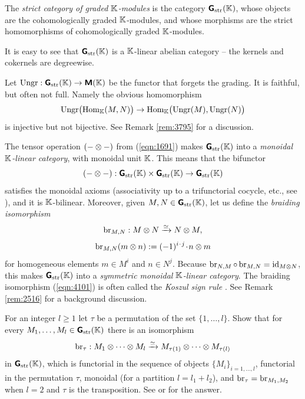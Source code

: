 \begin{dfn} \label{dfn:4100}
The {\em strict category of graded $\mathbb{K}$-modules}%
is the category $\boldsymbol{\mathsf{G}}_{\mathrm{str}}(\mathbb{K})$,
whose objects are the cohomologically graded $\mathbb{K}$-modules, and whose morphisms 
are the strict homomorphisms of cohomologically graded $\mathbb{K}$-mod\-ules.
\end{dfn}

It is easy to see that $\boldsymbol{\mathsf{G}}_{\mathrm{str}}(\mathbb{K})$ is a $\mathbb{K}$-linear abelian
category -- the kernels and cokernels are degreewise. 

\begin{rem} \label{rem:4120}
Let 
$\operatorname{Ungr} : \boldsymbol{\mathsf{G}}_{\mathrm{str}}(\mathbb{K}) \to \boldsymbol{\mathsf{M}}(\mathbb{K})$
be the functor that forgets the grading. It is faithful, but often not full. 
Namely the obvious homomorphism 
\[ \operatorname{Ungr} \bigl( \operatorname{Hom}_{\mathbb{K}}(M, N) \bigr) \to 
\operatorname{Hom}_{\mathbb{K}} \bigl( \operatorname{Ungr}(M), \operatorname{Ungr}(N) \bigr) \]
is injective but not bijective. 
See Remark \ref{rem:3795} for a discussion. 
\end{rem}

The tensor operation $(- \otimes -)$ from (\ref{eqn:1691}) makes 
$\boldsymbol{\mathsf{G}}_{\mathrm{str}}(\mathbb{K})$ into a {\em monoidal $\mathbb{K}$-linear category},
with monoidal unit $\mathbb{K}$. This means that the bifunctor 
\[ (- \otimes -) : \boldsymbol{\mathsf{G}}_{\mathrm{str}}(\mathbb{K}) \times 
\boldsymbol{\mathsf{G}}_{\mathrm{str}}(\mathbb{K}) \to \boldsymbol{\mathsf{G}}_{\mathrm{str}}(\mathbb{K}) \]
satisfies the monoidal axioms (associativity up to a trifunctorial cocycle, 
etc., see \cite[Chapter XI]{Mac2}), and it is $\mathbb{K}$-bilinear. 
Moreover, given $M, N \in \boldsymbol{\mathsf{G}}_{\mathrm{str}}(\mathbb{K})$, let us define the 
{\em braiding isomorphism}%
\begin{equation} \label{eqn:4100}
\operatorname{br}_{M, N} : M \otimes N \xrightarrow{\simeq} N \otimes M , 
\end{equation}
\begin{equation} \label{eqn:4101}
\operatorname{br}_{M, N}(m \otimes n) := (-1)^{i \mspace{1.5mu}{\cdot}\mspace{1.5mu} j} \mspace{1.5mu}{\cdot}\mspace{1.5mu} n \otimes m 
\end{equation}
for homogeneous elements $m \in M^i$ and $n \in N^j$.
Because 
$\operatorname{br}_{N, M} \circ \operatorname{br}_{M, N} = \operatorname{id}_{M \otimes N}$,
this makes $\boldsymbol{\mathsf{G}}_{\mathrm{str}}(\mathbb{K})$ into a {\em symmetric 
monoidal $\mathbb{K}$-linear category}. The braiding isomorphism (\ref{eqn:4101})
is often called the {\em Koszul sign rule}%
.
See Remark \ref{rem:2516} for a background discussion. 

\begin{exer} \label{exer:4100}
For an integer $l \geq 1$ let $\tau$ be a permutation of the set 
$\{ 1, \ldots, l \}$. Show that for every 
$M_1, \ldots, M_l \in \boldsymbol{\mathsf{G}}_{\mathrm{str}}(\mathbb{K})$ there is an isomorphism 
\[ \operatorname{br}_{\tau} : M_1 \otimes \cdots \otimes M_l \xrightarrow{\simeq} 
M_{\tau(1)} \otimes \cdots \otimes M_{\tau(l)} \]
in $\boldsymbol{\mathsf{G}}_{\mathrm{str}}(\mathbb{K})$, which is functorial in the sequence of objects
$\{ M_i \}_{i = 1, \ldots, l}$, functorial in the permutation $\tau$, monoidal
(for a partition $l = l_1 + l_2$), and 
$\operatorname{br}_{\tau} = \operatorname{br}_{M_1, M_2}$
when $l = 2$ and $\tau$ is the transposition.
See \cite[Theorem XI.1.1]{Mac2} or \cite{Berger} for the answer.
\end{exer}

